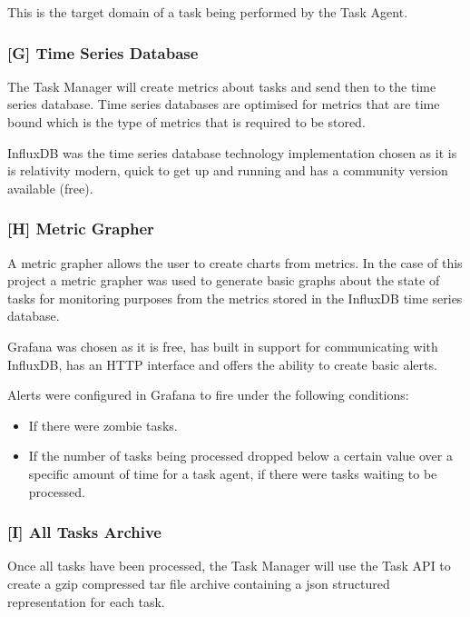 \documentclass{mscreport}
\begin{document}
This is the target domain of a task being performed by the Task Agent.

\subsubsection{[G] Time Series Database}

The Task Manager will create metrics about tasks and send then to the time series database. Time series databases are optimised for metrics that are time bound which is the type of metrics that is required to be stored. 

\vspace{0.3cm} \noindent
InfluxDB was the time series database technology implementation chosen as it is is relativity modern, quick to get up and running and has a community version available (free).

\subsubsection{[H] Metric Grapher}

A metric grapher allows the user to create charts from metrics. In the case of this project a metric grapher was used to generate basic graphs about the state of tasks for monitoring purposes from the metrics stored in the InfluxDB time series database.

\vspace{0.3cm} \noindent
Grafana was chosen as it is free, has built in support for communicating with InfluxDB, has an HTTP interface and offers the ability to create basic alerts.

\vspace{0.3cm} \noindent
Alerts were configured in Grafana to fire under the following conditions:

\begin{itemize}
	\setlength\itemsep{0.1em}
    \item If there were zombie tasks.
    \item If the number of tasks being processed dropped below a certain value over a specific amount of time for a task agent, if there were tasks waiting to be processed.
\end{itemize}

\subsubsection{[I] All Tasks Archive}

Once all tasks have been processed, the Task Manager will use the Task API to create a gzip compressed tar file archive containing a json structured representation for each task.
\end{document}
